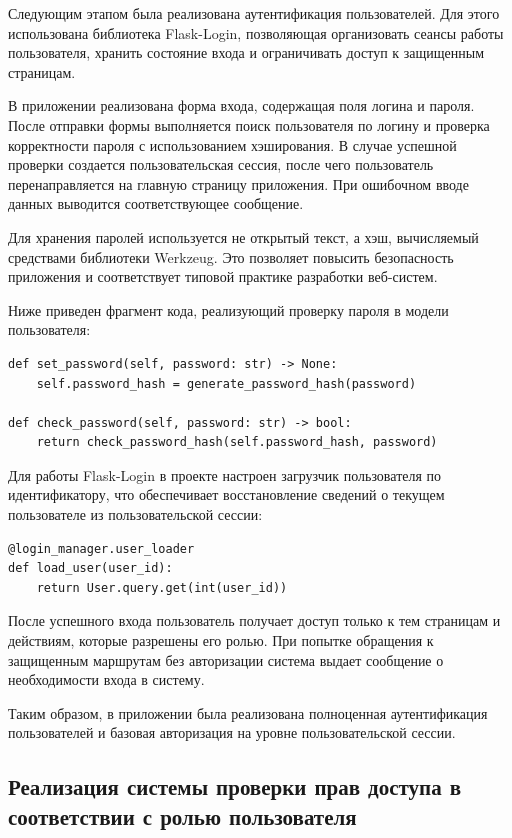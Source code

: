 Следующим этапом была реализована аутентификация пользователей. Для этого использована библиотека Flask-Login, позволяющая организовать сеансы работы пользователя, хранить состояние входа и ограничивать доступ к защищенным страницам.

В приложении реализована форма входа, содержащая поля логина и пароля. После отправки формы выполняется поиск пользователя по логину и проверка корректности пароля с использованием хэширования. В случае успешной проверки создается пользовательская сессия, после чего пользователь перенаправляется на главную страницу приложения. При ошибочном вводе данных выводится соответствующее сообщение.

Для хранения паролей используется не открытый текст, а хэш, вычисляемый средствами библиотеки Werkzeug. Это позволяет повысить безопасность приложения и соответствует типовой практике разработки веб-систем.

Ниже приведен фрагмент кода, реализующий проверку пароля в модели пользователя:

\begin{lstlisting}
def set_password(self, password: str) -> None:
    self.password_hash = generate_password_hash(password)

def check_password(self, password: str) -> bool:
    return check_password_hash(self.password_hash, password)
\end{lstlisting}

Для работы Flask-Login в проекте настроен загрузчик пользователя по идентификатору, что обеспечивает восстановление сведений о текущем пользователе из пользовательской сессии:

\begin{lstlisting}
@login_manager.user_loader
def load_user(user_id):
    return User.query.get(int(user_id))
\end{lstlisting}

После успешного входа пользователь получает доступ только к тем страницам и действиям, которые разрешены его ролью. При попытке обращения к защищенным маршрутам без авторизации система выдает сообщение о необходимости входа в систему.

Таким образом, в приложении была реализована полноценная аутентификация пользователей и базовая авторизация на уровне пользовательской сессии.

\subsection{Реализация системы проверки прав доступа в соответствии с ролью пользователя}

